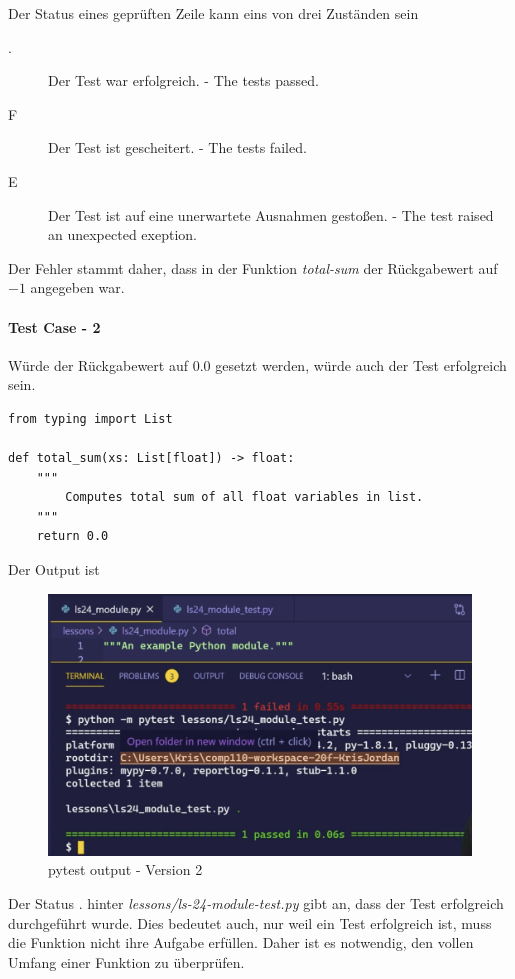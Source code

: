 Der Status eines geprüften Zeile kann eins von drei Zuständen sein
\begin{description}
	\item[.] Der Test war erfolgreich. - The tests passed.
	\item[F] Der Test ist gescheitert. - The tests failed.
	\item[E] Der Test ist auf eine unerwartete Ausnahmen gestoßen. - The test raised an unexpected exeption. 
\end{description}

Der Fehler stammt daher, dass in der Funktion \textit{total-sum} der Rückgabewert auf $-1$ angegeben war.

\paragraph{Test Case - 2}
Würde der Rückgabewert auf $0.0$ gesetzt werden, würde auch der Test erfolgreich sein.

\begin{lstlisting}[style=python, caption={Skelton-Function - Version 2; Skeleton.py}, captionpos=b]
from typing import List

def total_sum(xs: List[float]) -> float:
    """
        Computes total sum of all float variables in list.
    """
    return 0.0
\end{lstlisting}

Der Output ist

\begin{figure}[H]
	\centering
	\includegraphics[scale = 0.6]{attachment/chapter_2/Scc086}
	\caption{pytest output - Version 2}
\end{figure}

Der Status $.$ hinter \textit{lessons/ls-24-module-test.py} gibt an, dass der Test erfolgreich durchgeführt wurde. Dies bedeutet auch, nur weil ein Test erfolgreich ist, muss die Funktion nicht ihre Aufgabe erfüllen. Daher ist es notwendig, den vollen Umfang einer Funktion zu überprüfen.

